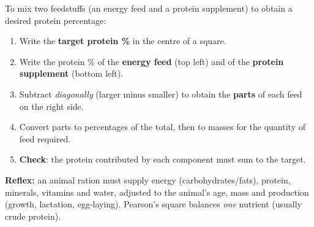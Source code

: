 \documentclass[11pt]{article}
\begin{document}
\begin{methode}
To mix two feedstuffs (an energy feed and a protein supplement) to obtain a desired protein percentage:
\begin{enumerate}
\item Write the \textbf{target protein \%} in the centre of a square.
\item Write the protein \% of the \textbf{energy feed} (top left) and of the \textbf{protein supplement} (bottom left).
\item Subtract \emph{diagonally} (larger minus smaller) to obtain the \textbf{parts} of each feed on the right side.
\item Convert parts to percentages of the total, then to masses for the quantity of feed required.
\item \textbf{Check}: the protein contributed by each component must sum to the target.
\end{enumerate}
\textbf{Reflex:} an animal ration must supply energy (carbohydrates/fats), protein, minerals, vitamins and water, adjusted to the animal's age, mass and production (growth, lactation, egg-laying). Pearson's square balances \emph{one} nutrient (usually crude protein).
\end{methode}
\end{document}

